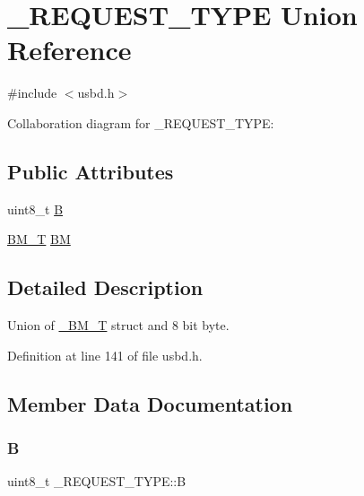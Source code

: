 \hypertarget{union___r_e_q_u_e_s_t___t_y_p_e}{}\section{\+\_\+\+R\+E\+Q\+U\+E\+S\+T\+\_\+\+T\+Y\+PE Union Reference}
\label{union___r_e_q_u_e_s_t___t_y_p_e}


{\ttfamily \#include $<$usbd.\+h$>$}



Collaboration diagram for \+\_\+\+R\+E\+Q\+U\+E\+S\+T\+\_\+\+T\+Y\+PE\+:
\subsection*{Public Attributes}
\begin{DoxyCompactItemize}
\item 
uint8\+\_\+t \hyperlink{union___r_e_q_u_e_s_t___t_y_p_e_a4ea7b8b71f7922b27a4b7833afcd645d}{B}
\item 
\hyperlink{group___u_s_b_d___core_ga0c191764322e096fa81c1228eb62e63f}{B\+M\+\_\+T} \hyperlink{union___r_e_q_u_e_s_t___t_y_p_e_aeb4f47d17f203fbb11ffd16c454dde0c}{BM}
\end{DoxyCompactItemize}


\subsection{Detailed Description}
Union of \hyperlink{struct___b_m___t}{\+\_\+\+B\+M\+\_\+T} struct and 8 bit byte. 

Definition at line 141 of file usbd.\+h.



\subsection{Member Data Documentation}
\mbox{\label{union___r_e_q_u_e_s_t___t_y_p_e_a4ea7b8b71f7922b27a4b7833afcd645d}} 
\subsubsection{\texorpdfstring{B}{B}}
{\footnotesize\ttfamily uint8\+\_\+t \+\_\+\+R\+E\+Q\+U\+E\+S\+T\+\_\+\+T\+Y\+P\+E\+::B}

